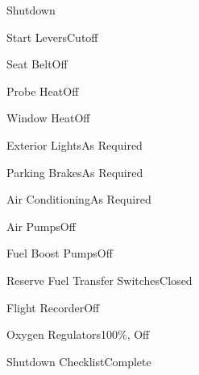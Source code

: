 \documentclass[sim-use, blue_items, halfpage]{checklist}
\begin{document}
\begin{checklist}{Shutdown}
	\item{Start Levers}{Cutoff}
	\item{Seat Belt}{Off}
	\item{Probe Heat}{Off}
	\item{Window Heat}{Off}
	\item{Exterior Lights}{As Required}
	\item{Parking Brakes}{As Required}
	\item{Air Conditioning}{As Required}
	\item{Air Pumps}{Off}
	\item{Fuel Boost Pumps}{Off}
	\item{Reserve Fuel Transfer Switches}{Closed}
	\item{Flight Recorder}{Off}
	\item{Oxygen Regulators}{100\%, Off}
	\item{Shutdown Checklist}{Complete}
\end{checklist}
\end{document}
